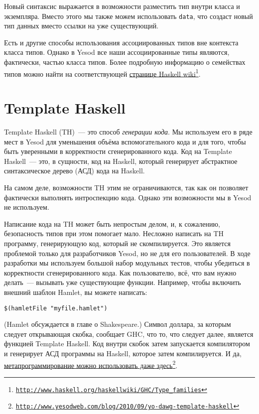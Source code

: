 Новый синтаксис выражается в возможности разместить тип внутри класса и экземпляра. Вместо этого мы также можем использовать \lstinline'data', что создаст новый тип данных вместо ссылки на уже существующий.

\begin{remark}
Есть и другие способы использования ассоциированных типов вне контекста класса типов. Однако в Yesod все наши ассоциированные типы являются, фактически, частью класса типов. Более подробную информацию о семействах типов можно найти на соответствующей \href{http://www.haskell.org/haskellwiki/GHC/Type\_families}{странице Haskell wiki}\footnote{\href{http://www.haskell.org/haskellwiki/GHC/Type\_families}{\texttt{http://www.haskell.org/haskellwiki/GHC/Type\_families}}}.
\end{remark}

\section{Template Haskell}

Template Haskell (TH)~--- это способ \emph{генерации кода}. Мы используем его в ряде мест в Yesod для уменьшения объёма вспомогательного кода и для того, чтобы быть уверенными в корректности сгенерированного кода. Код на Template Haskell~--- это, в сущности, код на Haskell, который генерирует абстрактное синтаксическое дерево (АСД) кода на Haskell.

\begin{remark}
На самом деле, возможности TH этим не ограничиваются, так как он позволяет фактически выполнять интроспекцию кода. Однако эти возможности мы в Yesod не используем.
\end{remark}

Написание кода на TH может быть непростым делом, и, к сожалению, безопасность типов при этом помогает мало. Несложно написать на TH программу, генерирующую код, который не скомпилируется. Это является проблемой только для разработчиков Yesod, но не для его пользователей. В ходе разработки мы используем большой набор модульных тестов, чтобы убедиться в корректности сгенерированного кода. Как пользователю, всё, что вам нужно делать~--- вызывать уже существующие функции. Например, чтобы включить внешний шаблон Hamlet, вы можете написать:

\begin{lstlisting}
$(hamletFile "myfile.hamlet")
\end{lstlisting}

(Hamlet обсуждается в главе о Shakespeare.) Символ доллара, за которым следует открывающая скобка, сообщает GHC, что то, что следует далее, является функцией Template Haskell. Код внутри скобок затем запускается компилятором и генерирует АСД программы на Haskell, которое затем компилируется. И да, \href{http://www.yesodweb.com/blog/2010/09/yo-dawg-template-haskell}{метапрограммирование можно использовать даже здесь}\footnote{\href{http://www.yesodweb.com/blog/2010/09/yo-dawg-template-haskell}{\texttt{http://www.yesodweb.com/blog/2010/09/yo-dawg-template-haskell}}}.


